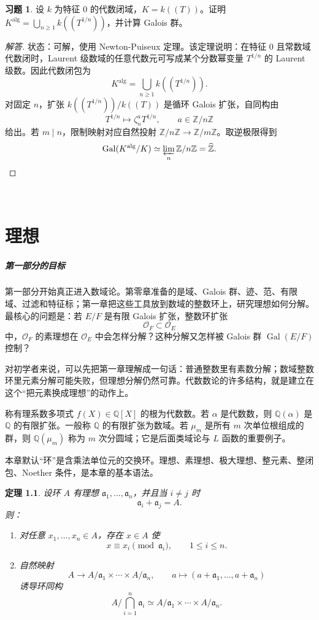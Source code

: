 \documentclass[11pt,a4paper,openany]{ctexbook}
\numberwithin{equation}{chapter}
\newcommand{\Q}{\mathbb{Q}}
\newcommand{\Z}{\mathbb{Z}}
\newcommand{\Gal}{\operatorname{Gal}}
\theoremstyle{plain}
\newtheorem{theorem}{定理}[chapter]
\theoremstyle{definition}
\newtheorem{exercise}[theorem]{习题}
\theoremstyle{remark}
\begin{document}
\begin{exercise}
设 $k$ 为特征 $0$ 的代数闭域，$K=k((T))$。证明 $K^{\mathrm{alg}}=\bigcup_{n\ge1}k((T^{1/n}))$，并计算 Galois 群。
\end{exercise}
\begin{proof}[解答]
状态：可解，使用 Newton-Puiseux 定理。该定理说明：在特征 $0$ 且常数域代数闭时，Laurent 级数域的任意代数元可写成某个分数幂变量 $T^{1/n}$ 的 Laurent 级数。因此代数闭包为
\[
K^{\mathrm{alg}}=\bigcup_{n\ge1}k((T^{1/n})).
\]
对固定 $n$，扩张 $k((T^{1/n}))/k((T))$ 是循环 Galois 扩张，自同构由
\[
T^{1/n}\mapsto \zeta_n^aT^{1/n},\qquad a\in\Z/n\Z
\]
给出。若 $m\mid n$，限制映射对应自然投射 $\Z/n\Z\to\Z/m\Z$。取逆极限得到
\[
\Gal(K^{\mathrm{alg}}/K)\simeq\varprojlim_n\Z/n\Z=\widehat{\Z}.
\]
\end{proof}
 ﻿\chapter{理想}

\paragraph{第一部分的目标}
第一部分开始真正进入数域论。第零章准备的是域、Galois 群、迹、范、有限域、过滤和特征标；第一章把这些工具放到数域的整数环上，研究理想如何分解。最核心的问题是：若 $E/F$ 是有限 Galois 扩张，整数环扩张
\[
\mathcal O_F\subset \mathcal O_E
\]
中，$\mathcal O_F$ 的素理想在 $\mathcal O_E$ 中会怎样分解？这种分解又怎样被 Galois 群 $\Gal(E/F)$ 控制？

对初学者来说，可以先把第一章理解成一句话：普通整数里有素数分解；数域整数环里元素分解可能失败，但理想分解仍然可靠。代数数论的许多结构，就是建立在这个“把元素换成理想”的动作上。

称有理系数多项式 $f(X)\in\Q[X]$ 的根为代数数。若 $\alpha$ 是代数数，则 $\Q(\alpha)$ 是 $\Q$ 的有限扩张。一般称 $\Q$ 的有限扩张为数域。若 $\mu_m$ 是所有 $m$ 次单位根组成的群，则 $\Q(\mu_m)$ 称为 $m$ 次分圆域；它是后面类域论与 $L$ 函数的重要例子。

本章默认“环”是含乘法单位元的交换环。理想、素理想、极大理想、整元素、整闭包、Noether 条件，是本章的基本语法。

\begin{theorem}
设环 $A$ 有理想 $\mathfrak a_1,\dots,\mathfrak a_n$，并且当 $i\ne j$ 时
\[
\mathfrak a_i+\mathfrak a_j=A.
\]
则：
\begin{enumerate}[label=(\arabic*)]
\item 对任意 $x_1,\dots,x_n\in A$，存在 $x\in A$ 使
\[
x\equiv x_i\pmod{\mathfrak a_i},\qquad 1\le i\le n.
\]
\item 自然映射
\[
A\longrightarrow A/\mathfrak a_1\times\cdots\times A/\mathfrak a_n,\qquad
a\longmapsto(a+\mathfrak a_1,\dots,a+\mathfrak a_n)
\]
诱导环同构
\[
A/\bigcap_{i=1}^n\mathfrak a_i
\simeq
A/\mathfrak a_1\times\cdots\times A/\mathfrak a_n.
\]
\end{enumerate}
\end{theorem}
\end{document}
